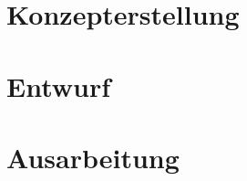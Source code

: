 


\section{Konzepterstellung}\label{cha:3_Konzepterstellung}




\section{Entwurf}\label{cha:3_Entwurf}




\section{Ausarbeitung}\label{cha:3_Ausarbeitung}

